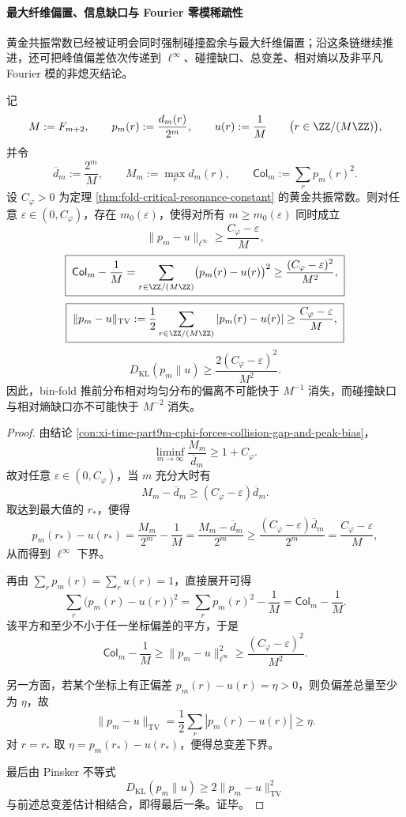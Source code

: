 \paragraph{最大纤维偏置、信息缺口与 Fourier 零模稀疏性}
黄金共振常数已经被证明会同时强制碰撞盈余与最大纤维偏置；沿这条链继续推进，还可把峰值偏差依次传递到 \(\ell^\infty\)、碰撞缺口、总变差、相对熵以及非平凡 Fourier 模的非熄灭结论。

\begin{theorem}[最大纤维偏置给出的统一非均匀性下界链]\label{thm:xi-time-part9m-maxfiber-uniformity-gap-chain}
记
\[
M:=F_{m+2},
\qquad
p_m(r):=\frac{d_m(r)}{2^m},
\qquad
u(r):=\frac{1}{M}
\qquad
\bigl(r\in \ZZ/(M\ZZ)\bigr),
\]
并令
\[
\overline d_m:=\frac{2^m}{M},
\qquad
M_m:=\max_r d_m(r),
\qquad
\mathsf{Col}_m:=\sum_{r}p_m(r)^2.
\]
设 \(C_\varphi>0\) 为定理 \ref{thm:fold-critical-resonance-constant} 的黄金共振常数。则对任意 \(\varepsilon\in(0,C_\varphi)\)，存在 \(m_0(\varepsilon)\)，使得对所有 \(m\ge m_0(\varepsilon)\) 同时成立
\[
\boxed{\;
\|p_m-u\|_{\ell^\infty}\ge \frac{C_\varphi-\varepsilon}{M},\;}
\]
\[
\boxed{\;
\mathsf{Col}_m-\frac{1}{M}
=
\sum_{r\in \ZZ/(M\ZZ)}\bigl(p_m(r)-u(r)\bigr)^2
\ge
\frac{(C_\varphi-\varepsilon)^2}{M^2},\;}
\]
\[
\boxed{\;
\|p_m-u\|_{\mathrm{TV}}
:=
\frac12\sum_{r\in \ZZ/(M\ZZ)}|p_m(r)-u(r)|
\ge
\frac{C_\varphi-\varepsilon}{M},\;}
\]
\[
\boxed{\;
D_{\mathrm{KL}}(p_m\|u)\ge \frac{2(C_\varphi-\varepsilon)^2}{M^2}.\;}
\]
因此，bin-fold 推前分布相对均匀分布的偏离不可能快于 \(M^{-1}\) 消失，而碰撞缺口与相对熵缺口亦不可能快于 \(M^{-2}\) 消失。
\end{theorem}
\begin{proof}
由结论 \ref{con:xi-time-part9m-cphi-forces-collision-gap-and-peak-bias}，
\[
\liminf_{m\to\infty}\frac{M_m}{\overline d_m}\ge 1+C_\varphi.
\]
故对任意 \(\varepsilon\in(0,C_\varphi)\)，当 \(m\) 充分大时有
\[
M_m-\overline d_m\ge (C_\varphi-\varepsilon)\overline d_m.
\]
取达到最大值的 \(r_\ast\)，便得
\[
p_m(r_\ast)-u(r_\ast)
=
\frac{M_m}{2^m}-\frac{1}{M}
=
\frac{M_m-\overline d_m}{2^m}
\ge
\frac{(C_\varphi-\varepsilon)\overline d_m}{2^m}
=
\frac{C_\varphi-\varepsilon}{M},
\]
从而得到 \(\ell^\infty\) 下界。

再由 \(\sum_r p_m(r)=\sum_r u(r)=1\)，直接展开可得
\[
\sum_r\bigl(p_m(r)-u(r)\bigr)^2
=
\sum_r p_m(r)^2-\frac{1}{M}
=
\mathsf{Col}_m-\frac{1}{M}.
\]
该平方和至少不小于任一坐标偏差的平方，于是
\[
\mathsf{Col}_m-\frac{1}{M}
\ge
\|p_m-u\|_{\ell^\infty}^2
\ge
\frac{(C_\varphi-\varepsilon)^2}{M^2}.
\]

另一方面，若某个坐标上有正偏差 \(p_m(r)-u(r)=\eta>0\)，则负偏差总量至少为 \(\eta\)，故
\[
\|p_m-u\|_{\mathrm{TV}}
=
\frac12\sum_r|p_m(r)-u(r)|
\ge \eta.
\]
对 \(r=r_\ast\) 取 \(\eta=p_m(r_\ast)-u(r_\ast)\)，便得总变差下界。

最后由 Pinsker 不等式
\[
D_{\mathrm{KL}}(p_m\|u)\ge 2\|p_m-u\|_{\mathrm{TV}}^2
\]
与前述总变差估计相结合，即得最后一条。证毕。
\end{proof}

